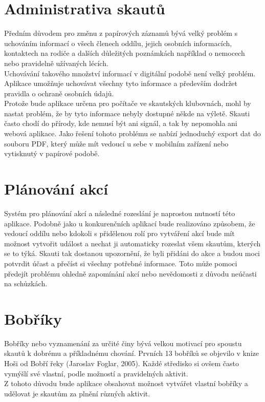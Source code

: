 \documentclass[twoside]{ctuthesis}
\begin{document}
\section{Administrativa skautů} 
Předním důvodem pro změnu z papírových záznamů bývá velký problém s uchováním informací o všech členech oddílu, jejich osobních informacích, kontaktech na rodiče a dalších důležitých poznámkách například o nemocech nebo pravidelně užívaných lécích. \\
Uchovávání takového množství informací v digitální podobě není velký problém. Aplikace umožňuje uchovávat všechny tyto informace a především dodržet pravidla o ochraně osobních údajů. \\
Protože bude aplikace určena pro počítače ve skautských klubovnách, mohl by nastat problém, že by tyto informace nebyly dostupné někde na výletě. Skauti často chodí do přírody, kde nemusí být ani signál, a tak by nepomohla ani webová aplikace. Jako řešení tohoto problému se nabízí jednoduchý export dat do souboru PDF, který může mít vedoucí u sebe v mobilním zařízení nebo vytisknutý v papírové podobě.
\section{Plánování akcí} 
Systém pro plánování akcí a následné rozeslání je naprostou nutností této aplikace. Podobně jako u konkurenčních aplikací bude realizováno způsobem, že vedoucí oddílu nebo kdokoli s přidělenou rolí pro vytváření akcí bude mít možnost vytvořit událost a nechat ji automaticky rozeslat všem skautům, kterých se to týká. Skauti tak dostanou upozornění, že byli přidáni do akce a budou moci potvrdit účast a přečíst si všechny potřebné informace. Toto může pomoci předejít problému ohledně zapomínání akcí nebo nevědomosti z důvodu neúčasti na schůzkách.


\section{Bobříky} 
Bobříky nebo vyznamenání za určité činy bývá velkou motivací pro spoustu skautů k dobrému a příkladnému chování. Prvních 13 bobříků se objevilo v knize Hoši od Bobří řeky (Jaroslav Foglar, 2005). Každé středisko si ovšem často vymýšlí své vlastní, podle možností a pravidelných aktivit. \\
Z tohoto důvodu bude aplikace obsahovat možnost vytvářet vlastní bobříky a udělovat je skautům za plnění různých aktivit.
\end{document}

